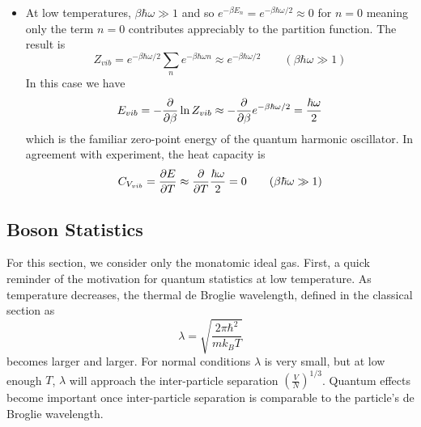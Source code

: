 \documentclass[11pt, a4paper]{article}
\begin{document}
\begin{itemize}
	\item At low temperatures, $ \beta \hbar \omega \gg 1 $ and so $ e^{-\beta E_{n}} = e^{-\beta \hbar \omega /2} \approx 0 $ for $ n = 0 $ meaning only the term $ n = 0 $ contributes appreciably to the partition function. The result is
	\begin{equation*}
		Z_{vib} = e^{-\beta \hbar \omega /2 } \sum_{n} e^{-\beta \hbar \omega n } \approx  e^{-\beta \hbar \omega /2 }  \qquad (\beta \hbar \omega \gg 1)
	\end{equation*}
	In this case we have 
	\begin{equation*}
		E_{vib} = - \pdv{}{\beta} \ln Z_{vib}\approx - \pdv{}{\beta}e^{-\beta \hbar \omega /2 } = \frac{\hbar \omega}{2}
	\end{equation*}
	which is the familiar zero-point energy of the quantum harmonic oscillator. In agreement with experiment, the heat capacity is
	\begin{equation*}
		C_{V_{vib}} = \pdv{E}{T} \approx \pdv{}{T} \frac{\hbar \omega}{2} = 0 \qquad (\beta \hbar \omega \gg 1)
	\end{equation*}
\end{itemize}

\subsection{Boson Statistics}
For this section, we consider only the monatomic ideal gas. First, a quick reminder of the motivation for quantum statistics at low temperature. As temperature decreases, the thermal de Broglie wavelength, defined in the classical section as
\begin{equation*}
	\lambda = \sqrt{\frac{2\pi \hbar^{2}}{m k_{B}T}}
\end{equation*}
becomes larger and larger. For normal conditions $ \lambda $ is very small, but at low enough $ T $, $ \lambda $ will approach the inter-particle separation $ \left(\frac{V}{N}\right)^{1/3} $. Quantum effects become important once inter-particle separation is comparable to the particle's de Broglie wavelength.
\end{document}
